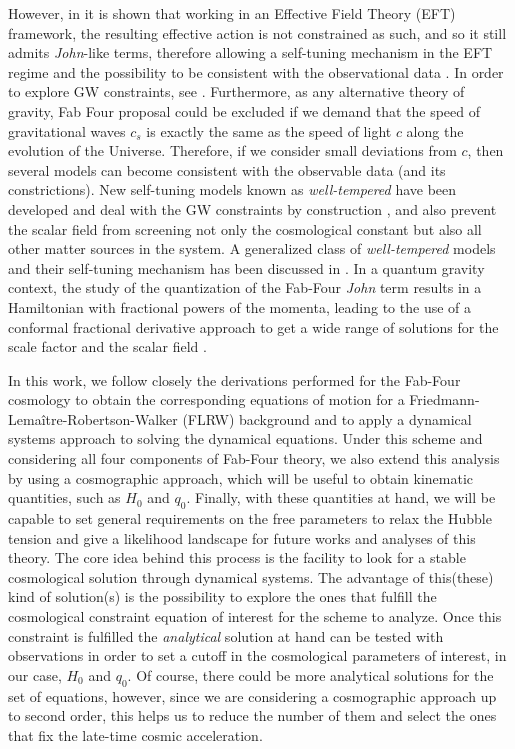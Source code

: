 \documentclass[onecolumn,superscriptaddress,secnumarabic,amssymb,amsmath,nobibnotes,aps,prd,nofootinbib,altaffilletter]{revtex4}
\begin{document}
However, in \cite{Latosh:2018xai} it is shown that working in an Effective Field Theory (EFT) framework, the resulting effective action is not constrained as such, and so it still admits \textit{John}-like terms, therefore allowing a self-tuning mechanism in the EFT regime and the possibility to be consistent with the observational data \cite{Copeland:2018yuh,Ezquiaga:2017ekz}. In order to explore GW constraints, see \cite{Bordin_2020}. Furthermore, as any alternative theory of gravity, Fab Four proposal could be excluded if we demand that the speed of gravitational waves $c_s$ is exactly the same as the speed of light $c$ along the evolution of the Universe. Therefore, if we consider small deviations from $c$, then several models can become consistent with the observable data (and its constrictions).
New self-tuning models known as \textit{well-tempered} have been developed and deal with the GW constraints by construction \cite{Appleby_2018}, and also prevent the scalar field from screening not only the cosmological constant but also all other matter sources in the system.   A generalized class of \textit{well-tempered} models and their self-tuning mechanism has been discussed in \cite{Emond:2018fvv}. In a quantum gravity context, the study of the quantization of the Fab-Four \textit{John} term results in a Hamiltonian with fractional powers of the momenta, leading to the use of a conformal fractional derivative approach to get a wide range of solutions for the scale factor and the scalar field \cite{Torres:2020xkw}.

In this work, we follow closely the derivations performed for the Fab-Four cosmology \cite{Copeland:2012qf} to obtain the corresponding equations of motion for a Friedmann-Lemaître-Robertson-Walker (FLRW) background and to apply a dynamical systems approach to solving the dynamical equations. Under this scheme and considering all four components of Fab-Four theory, we also extend this analysis by using a cosmographic approach, which will be useful to obtain kinematic quantities, such as $H_0$ and $q_0$. Finally, with these quantities at hand, we will be capable to set general requirements on the free parameters to relax the Hubble tension and give a likelihood landscape for future works and analyses of this theory.
The core idea behind this process is the facility to look for a stable cosmological solution through dynamical systems. The advantage of this(these) kind of solution(s) is the possibility to explore the ones that fulfill the cosmological constraint equation of interest for the scheme to analyze. Once this constraint is fulfilled the \textit{analytical} solution at hand can be tested with observations in order to set a cutoff in the cosmological parameters of interest, in our case, $H_0$ and $q_0$. Of course, there could be more analytical solutions for the set of equations, however, since we are considering a cosmographic approach up to second order, this helps us to reduce the number of them and select the ones that fix the late-time cosmic acceleration. 
  
\end{document}
